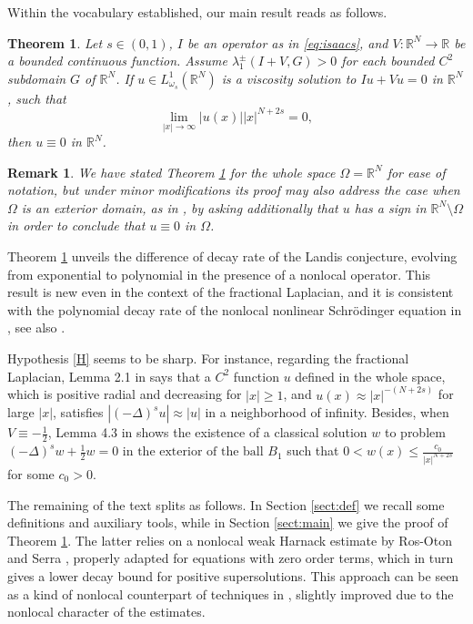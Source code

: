 \documentclass[a4paper,11pt]{article}
\newcommand{\R}{\mathbb{R}}
\newcommand{\Lomega}{L_{\omega_s}^1(\R^N)}
\newtheorem{theorem}{Theorem}
\newtheorem{remark}{Remark}
\begin{document}
Within the vocabulary established, our main result reads as follows.

\begin{theorem}
\label{theo:landis}
Let $s\in (0,1)$,  $I$ be an operator as in \eqref{eq:isaacs}, and $V:\R^N \rightarrow \R$ be a bounded continuous function.
Assume $\lambda_1^\pm ( I + V, G) >0$ for each bounded $C^2$ subdomain $G$ of $\R^N$. \smallskip
	 If $u\in \Lomega$ is a viscosity solution to $Iu + Vu = 0$ in $\R^N$, such that 
\begin{equation}\label{H}
\lim_{|x| \rightarrow \infty} |u(x)||x|^{N+2s} = 0,
\end{equation}
then $u\equiv 0$ in $\R^N$.
\end{theorem}

\begin{remark}
We have stated Theorem \ref{theo:landis} for the whole space $\Omega=\R^N$ for ease of notation, but under minor modifications its proof may also address the case when $\Omega$ is an exterior domain, as in \cite{sirakov_vazquez_2021}, by asking additionally that $u$ has a sign in $\R^N \setminus \Omega$ in order to conclude that $u\equiv 0$ in $\Omega$.
\end{remark}

Theorem \ref{theo:landis} unveils the difference of decay rate of the Landis conjecture, evolving from exponential to polynomial in the presence of a nonlocal operator. This result is new even in the context of the fractional Laplacian, and it is consistent with the polynomial decay rate of the nonlocal nonlinear Schrödinger equation in \cite[Theorem 1.5]{Felmer_Quaas_Tan_2012}, see also \cite[Chapter 7]{BucurValdinoci}. 

Hypothesis \eqref{H} seems to be sharp.
For instance, regarding the fractional Laplacian,
Lemma 2.1 in \cite{BoVa} says that a $C^2$ function $u$ defined in the whole space, which is positive radial and decreasing for $|x|\ge 1$, and  $u(x)\approx |x|^{-(N+2s)}$ for large $|x|$, satisfies $ |(-\Delta)^s u| \approx |u| $ in a neighborhood of infinity.
Besides,  when $V\equiv -\frac12$, Lemma 4.3 in \cite{Felmer_Quaas_Tan_2012} shows the existence of a classical solution $w$ to problem 
$(-\Delta)^sw + \frac12 w = 0 \text{ in the exterior of the ball }  B_1$
such that 
$0 <w(x) \leq \frac{c_0}{|x|^{N+2s}}$
for some $c_0 > 0$.

\smallskip

The remaining of the text splits as follows.
In Section \ref{sect:def} we recall some definitions and auxiliary tools, while in Section \ref{sect:main} we give the proof of Theorem \ref{theo:landis}. 
The latter relies on a nonlocal weak Harnack estimate by Ros-Oton and Serra \cite{ros-oton_boundary_2019}, properly adapted for equations with zero order terms, which in turn gives a lower decay bound for positive supersolutions. This approach can be seen as a kind of nonlocal counterpart of techniques in \cite{sirakov_vazquez_2021}, slightly improved due to the nonlocal character of the estimates.
\end{document}

